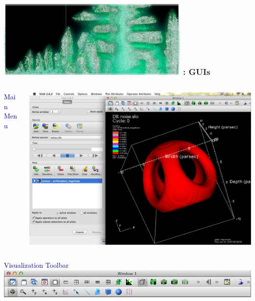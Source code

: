 \begin{frame}
\frametitle{\href{https://wci.llnl.gov/simulation/computer-codes/visit/}{\includegraphics[height=.85cm]{figs/visit-logos/VisIt-04}} \hspace{-.85cm}{\bf \textcolor{white}{VisIt}}: GUIs}

\vspace{-3mm}
\begin{columns}
\begin{column}{5cm}
\begin{beamerboxesrounded}[upper=block head,lower=block body,shadow=true]{  \textcolor{DarkBlue}{Main Menu} }

        \textcolor{DarkBlue}{} 

        \textcolor{DarkBlue}{} 

        \textcolor{DarkBlue}{} 

        \textcolor{DarkBlue}{} 

        \textcolor{DarkBlue}{} 

        \textcolor{DarkBlue}{} 

        \textcolor{DarkBlue}{} 
\end{beamerboxesrounded}
\end{column}
\begin{column}{6cm}
        \centering
        \includegraphics[clip=true,trim=0 0 17cm 0, width=.85\columnwidth]{figs/visit-guis/VisIt_windows}
\end{column}
\end{columns}

\begin{beamerboxesrounded}[upper=block head,lower=block body,shadow=true]{  \textcolor{DarkBlue}{Visualization Toolbar} }
        \centering
        \includegraphics[width=.85\columnwidth]{figs/visit-guis/VisIt_toolbar}
\end{beamerboxesrounded}
\end{frame}


